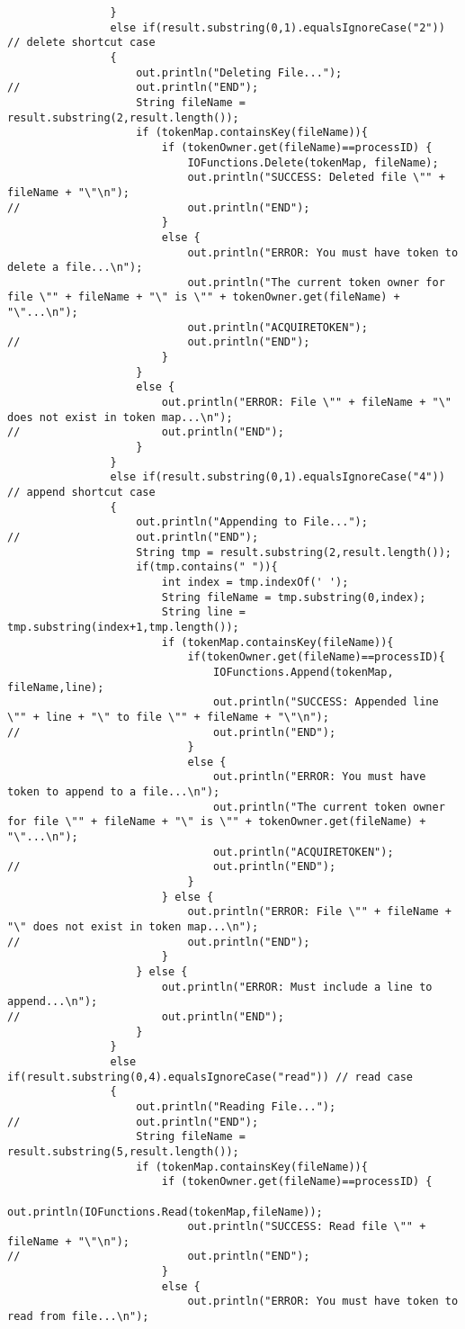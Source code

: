 \documentclass{article}
\begin{document}
\begin{lstlisting}
				}
				else if(result.substring(0,1).equalsIgnoreCase("2")) // delete shortcut case
				{
					out.println("Deleting File...");
//					out.println("END");
					String fileName = result.substring(2,result.length());
					if (tokenMap.containsKey(fileName)){
						if (tokenOwner.get(fileName)==processID) {
							IOFunctions.Delete(tokenMap, fileName);
							out.println("SUCCESS: Deleted file \"" + fileName + "\"\n");
//							out.println("END");
						}
						else {
							out.println("ERROR: You must have token to delete a file...\n");
							out.println("The current token owner for file \"" + fileName + "\" is \"" + tokenOwner.get(fileName) + "\"...\n");
							out.println("ACQUIRETOKEN");
//							out.println("END");
						}
					}
					else {
						out.println("ERROR: File \"" + fileName + "\" does not exist in token map...\n");
//						out.println("END");
					}
				}
				else if(result.substring(0,1).equalsIgnoreCase("4")) // append shortcut case
				{
					out.println("Appending to File...");
//					out.println("END");
					String tmp = result.substring(2,result.length());
					if(tmp.contains(" ")){
						int index = tmp.indexOf(' ');
						String fileName = tmp.substring(0,index);
						String line = tmp.substring(index+1,tmp.length());
						if (tokenMap.containsKey(fileName)){
							if(tokenOwner.get(fileName)==processID){
								IOFunctions.Append(tokenMap, fileName,line);
								out.println("SUCCESS: Appended line \"" + line + "\" to file \"" + fileName + "\"\n");
//								out.println("END");
							}
							else {
								out.println("ERROR: You must have token to append to a file...\n");
								out.println("The current token owner for file \"" + fileName + "\" is \"" + tokenOwner.get(fileName) + "\"...\n");
								out.println("ACQUIRETOKEN");
//								out.println("END");
							}
						} else {
							out.println("ERROR: File \"" + fileName + "\" does not exist in token map...\n");
//							out.println("END");
						}
					} else {
						out.println("ERROR: Must include a line to append...\n");
//						out.println("END");
					}
				}
				else if(result.substring(0,4).equalsIgnoreCase("read")) // read case
				{
					out.println("Reading File...");
//					out.println("END");
					String fileName = result.substring(5,result.length());
					if (tokenMap.containsKey(fileName)){
						if (tokenOwner.get(fileName)==processID) {
							out.println(IOFunctions.Read(tokenMap,fileName));
							out.println("SUCCESS: Read file \"" + fileName + "\"\n");
//							out.println("END");
						}
						else {
							out.println("ERROR: You must have token to read from file...\n");

\end{lstlisting}
\end{document}
